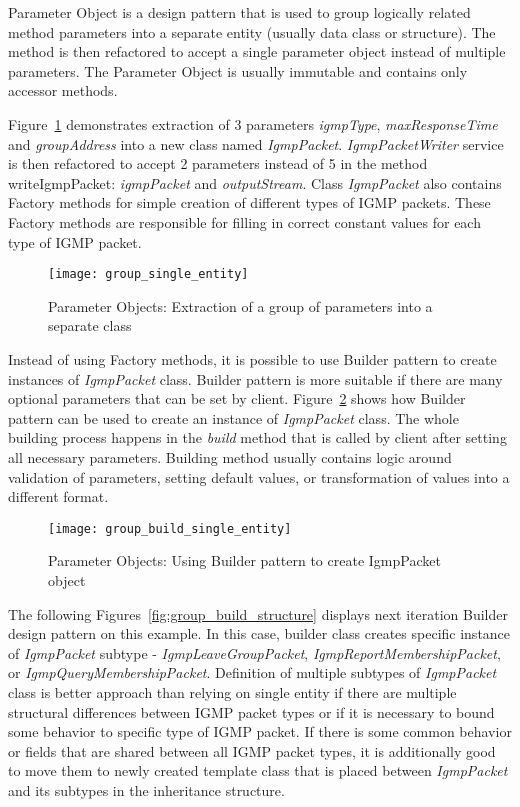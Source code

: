 Parameter Object is a design pattern that is used to group logically related method parameters into a separate entity
(usually data class or structure).
The method is then refactored to accept a single parameter object instead of multiple parameters.
The Parameter Object is usually immutable and contains only accessor methods.

Figure~\ref{fig:group_single_entity} demonstrates extraction of 3 parameters \textit{igmpType},
\textit{maxResponseTime} and \textit{groupAddress} into a new class named \textit{IgmpPacket}.
\textit{IgmpPacketWriter} service is then refactored to accept 2 parameters instead of 5 in the method writeIgmpPacket:
\textit{igmpPacket} and \textit{outputStream}.
Class \textit{IgmpPacket} also contains Factory methods for simple creation of different types of IGMP packets.
These Factory methods are responsible for filling in correct constant values for each type of IGMP packet.

\begin{figure}[!htb]
    \centering
    \texttt{[image: group\_single\_entity]}
    \caption{Parameter Objects: Extraction of a group of parameters into a separate class}
    \label{fig:group_single_entity}
\end{figure}

Instead of using Factory methods, it is possible to use Builder pattern to create
instances of \textit{IgmpPacket} class.
Builder pattern is more suitable if there are many optional parameters that can be set by client.
Figure~\ref{fig:group_build_single_entity} shows how Builder pattern can be used to create an instance
of \textit{IgmpPacket} class.
The whole building process happens in the \textit{build} method that is called by client after setting all necessary
parameters.
Building method usually contains logic around validation of parameters, setting default values, or transformation
of values into a different format.

\begin{figure}[!htb]
    \centering
    \texttt{[image: group\_build\_single\_entity]}
    \caption{Parameter Objects: Using Builder pattern to create IgmpPacket object}
    \label{fig:group_build_single_entity}
\end{figure}

The following Figures~\ref{fig:group_build_structure} displays next iteration Builder design pattern on this example.
In this case, builder class creates specific instance of \textit{IgmpPacket} subtype - \textit{IgmpLeaveGroupPacket},
\textit{IgmpReportMembershipPacket}, or \textit{IgmpQueryMembershipPacket}.
Definition of multiple subtypes of \textit{IgmpPacket} class is better approach than relying on single entity
if there are multiple structural differences between IGMP packet types or if it is necessary to bound some behavior
to specific type of IGMP packet.
If there is some common behavior or fields that are shared between all IGMP packet types, it is additionally good
to move them to newly created template class that is placed between \textit{IgmpPacket} and its subtypes
in the inheritance structure.

